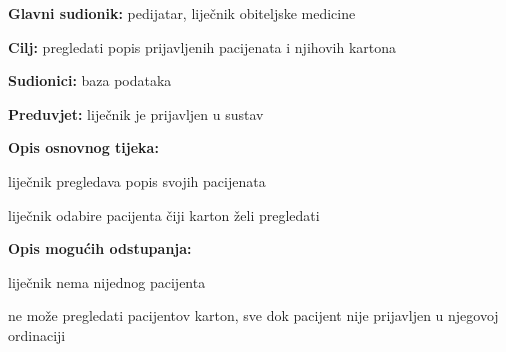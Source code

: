      
                    \noindent {}
					\begin{packed_item}
	
						\item \textbf{Glavni sudionik: }pedijatar, liječnik obiteljske medicine
						\item  \textbf{Cilj:} pregledati popis prijavljenih pacijenata i njihovih kartona
						\item  \textbf{Sudionici:} baza podataka
						\item  \textbf{Preduvjet:} liječnik je prijavljen u sustav
						\item  \textbf{Opis osnovnog tijeka:}
						
						\item[] \begin{packed_enum}
	
							\item liječnik pregledava popis svojih pacijenata
							\item liječnik odabire pacijenta čiji karton želi pregledati
						\end{packed_enum}
						
						\item  \textbf{Opis mogućih odstupanja:}
						
						\item[] \begin{packed_item}
	
							\item[2.a] liječnik nema nijednog pacijenta
							\item[] \begin{packed_enum}
								
								\item ne može pregledati pacijentov karton, sve dok pacijent nije prijavljen u njegovoj ordinaciji
							\end{packed_enum}
							
						\end{packed_item}
					\end{packed_item}


